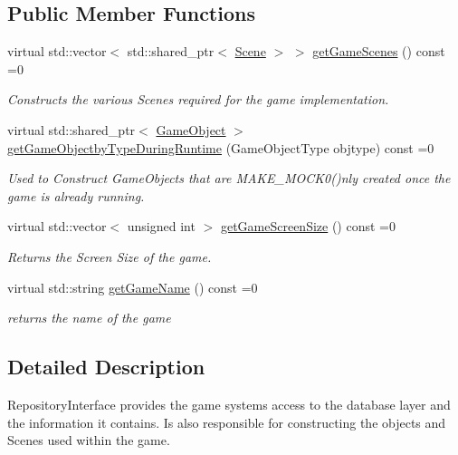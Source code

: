 \subsection*{Public Member Functions}
\begin{DoxyCompactItemize}
\item 
virtual std\+::vector$<$ std\+::shared\+\_\+ptr$<$ \hyperlink{class_scene}{Scene} $>$ $>$ \hyperlink{class_repositiory_interface_a29a0f0fadd317082cb504bbb1161d50d}{get\+Game\+Scenes} () const =0
\begin{DoxyCompactList}\small\item\em Constructs the various Scenes required for the game implementation. \end{DoxyCompactList}\item 
virtual std\+::shared\+\_\+ptr$<$ \hyperlink{class_game_object}{Game\+Object} $>$ \hyperlink{class_repositiory_interface_a7341b8009f262949e26759327b0a8ae4}{get\+Game\+Objectby\+Type\+During\+Runtime} (Game\+Object\+Type objtype) const =0
\begin{DoxyCompactList}\small\item\em Used to Construct Game\+Objects that are M\+A\+K\+E\+\_\+\+M\+O\+C\+K0()nly created once the game is already running. \end{DoxyCompactList}\item 
virtual std\+::vector$<$ unsigned int $>$ \hyperlink{class_repositiory_interface_a428e935faa2fd5790cbccc09f1066ef6}{get\+Game\+Screen\+Size} () const =0
\begin{DoxyCompactList}\small\item\em Returns the Screen Size of the game. \end{DoxyCompactList}\item 
virtual std\+::string \hyperlink{class_repositiory_interface_aa40617b92b721ec087dd69f3986e9efd}{get\+Game\+Name} () const =0
\begin{DoxyCompactList}\small\item\em returns the name of the game \end{DoxyCompactList}\end{DoxyCompactItemize}


\subsection{Detailed Description}
Repository\+Interface provides the game systems access to the database layer and the information it contains. Is also responsible for constructing the objects and Scenes used within the game. 

